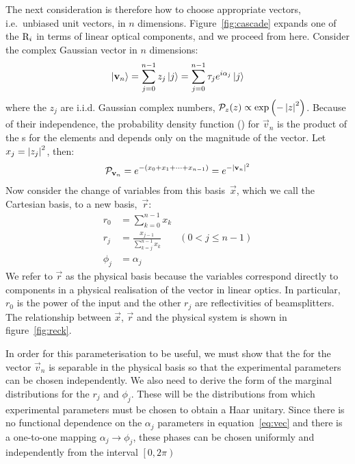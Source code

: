 The next consideration is therefore how to choose appropriate vectors, i.e.\
unbiased unit vectors, in \(n\) dimensions. Figure~\ref{fig:cascade} expands one
of the \(\mathrm{R}_{i}\) in terms of linear optical components, and we proceed
from here. Consider the complex Gaussian vector in \(n\) dimensions:
\begin{equation}
  \left|\mathbf{v}_{n}\right\rangle = \sum_{j=0}^{n-1} z_{j} \left|j\right\rangle = \sum_{j=0}^{n-1} \tau_{j}
  e^{i \alpha_{j}} \left|j\right\rangle
\end{equation}
where the \(z_j\) are i.i.d. Gaussian complex numbers, \( \mathcal{P}_{z} \!\left(z\right)
\propto \exp \left( -\left|z\right|^2 \right) \). Because of their independence, the
probability density function (\pdf{}) for \(\vec{v}_n\) is the product of the
\pdf{}s for the elements and depends only on the magnitude of the vector. Let
\(x_j = \left|z_j\right|^2 \), then:
\begin{equation}
  \label{eq:vec}
  \mathcal{P}_{\mathbf{v}_n} = e^{ -\left(x_0 + x_1 + \dots + x_{n-1} \right)} = e^{
  -\left|\mathbf{v}_n\right|^2}
\end{equation}
Now consider the change of variables from this basis~\(\vec{x}\), which we call
the Cartesian basis, to a new basis,~\(\vec{r}\):
\begin{align}
  r_0 &= \sum_{k=0}^{n-1} x_k \\
  r_j &= \frac{x_{j-1}}{\sum_{k=j}^{n-1} x_k} & \left( 0 < j \leq n-1 \right) \\
  \phi_j &= \alpha_{j}
\end{align}
We refer to \(\vec{r}\) as the physical basis because the variables
correspond directly to components in a physical realisation of the vector in
linear optics. In particular, \(r_0\) is the power of the input and the other
\(r_j\) are reflectivities of beamsplitters. The relationship between
\(\vec{x}\), \(\vec{r}\) and the physical system is shown in
figure~\ref{fig:reck}.

In order for this parameterisation to be useful, we must show that the \pdf{}
for the vector \(\vec{v}_n\) is separable in the physical basis so that the
experimental parameters can be chosen independently. We also need to derive the
form of the marginal distributions for the \(r_j\) and \(\phi_{j}\). These will
be the distributions from which experimental parameters must be chosen to
obtain a Haar unitary. Since there is no functional dependence on the
\(\alpha_{j}\) parameters in equation~\ref{eq:vec} and there is a one-to-one
mapping \(\alpha_{j} \rightarrow \phi_{j}\), these phases can be chosen
uniformly and independently from the interval \(\left[0,2\pi\right)\)

